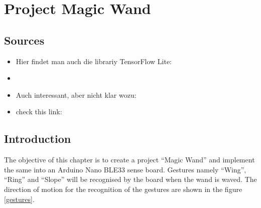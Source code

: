 %
%
%



\chapter{Project Magic Wand}

\section{Sources}




\begin{itemize}
    \item Hier findet man auch die librariy TensorFlow Lite: 
    \item {}
    \item Auch interessant, aber nicht klar wozu:
    \item check this link: 
\end{itemize}




\section{Introduction} 


The objective of this chapter is to create a project ``Magic Wand'' and implement the same into an Arduino Nano BLE33 sense  board. Gestures namely ``Wing'', ``Ring'' and ``Slope'' will be recognised by the board when the wand is waved. The direction of motion for the recognition of the gestures are shown in the figure \ref{gestures}.

